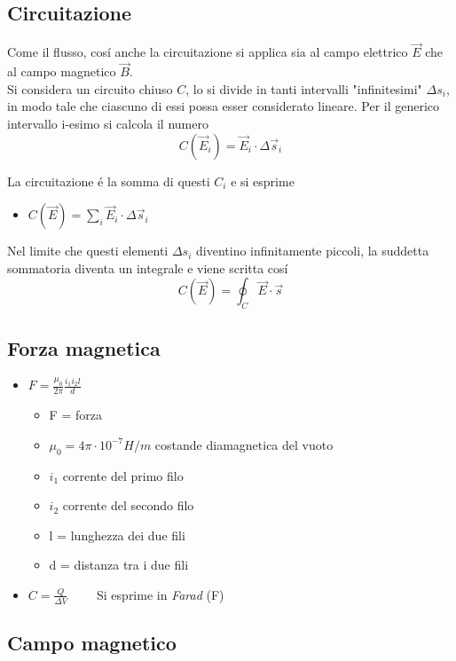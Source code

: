 \documentclass[17pt]{extarticle}
\begin{document}
\subsection{Circuitazione}

Come il flusso, cos\'i anche la circuitazione si applica sia al campo elettrico $\vec{E}$ che al campo magnetico $\vec{B}$. \\
Si considera un circuito chiuso $C$, lo si divide in tanti intervalli "infinitesimi" $\Delta s_i$, in modo tale che ciascuno di essi possa esser considerato lineare. Per il generico intervallo i-esimo si calcola il numero 
$$
 C(\vec{E}_i) = \vec{E}_i\cdot\Delta \vec{s}_i
$$

La circuitazione \'e la somma di questi $C_i$ e si esprime
\begin{itemize}
	\item $ C(\vec{E}) = \sum_i  \vec{E}_i\cdot\Delta \vec{s}_i$
\end{itemize}

Nel limite che questi elementi $\Delta s_i$ diventino infinitamente piccoli, la suddetta sommatoria diventa un integrale e viene scritta cos\'i
$$
C(\vec{E}) = \oint_{C} \vec{E}\cdot\vec{s}
$$

\subsection{Forza magnetica}

\begin{itemize}
	\item $F = \frac{\mu_0}{2\pi} \frac{i_1i_2l}{d}$
	\begin{itemize}
		\item F = forza
		\item $\mu_0 = 4\pi\cdot 10^{-7}H/m$ costande diamagnetica del vuoto
		\item $i_1$ corrente del primo filo
		\item $i_2$ corrente del secondo filo
		\item l = lunghezza dei due fili
		\item d = distanza tra i due fili
	\end{itemize}
	\item $C = \frac{Q}{\Delta V}\qquad$ Si esprime in \emph{Farad} (F)
\end{itemize}

\subsection{Campo magnetico}
\end{document}
